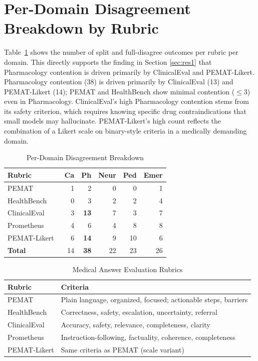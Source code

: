 \documentclass[11pt]{article}
\begin{document}
\section{Per-Domain Disagreement Breakdown by Rubric}
\label{app:domain}

Table~\ref{tab:rubric_domain} shows the number of split and full-disagree
outcomes per rubric per domain. This directly supports the finding in
Section \ref{sec:res1} that Pharmacology contention is driven primarily by ClinicalEval
and PEMAT-Likert.  Pharmacology
contention (38) is driven primarily by ClinicalEval (13) and
PEMAT-Likert (14); PEMAT and HealthBench show minimal
contention ($\leq$3) even in Pharmacology. ClinicalEval's high Pharmacology
contention stems from its safety criterion, which requires
knowing specific drug contraindications that small models may
hallucinate. PEMAT-Likert's high count reflects the combination of a Likert scale
on binary-style criteria in a medically demanding domain.

\begin{table}[h]
\centering
\small
\setlength{\tabcolsep}{6pt}
\begin{tabular}{@{}lrrrrr@{}}
\toprule
\textbf{Rubric} & \textbf{Ca} & \textbf{Ph}
  & \textbf{Neur} & \textbf{Ped} & \textbf{Emer} \\
\midrule
PEMAT        &  1 &  2 &  0 &  0 &  1 \\
HealthBench  &  0 &  3 &  2 &  2 &  4 \\
ClinicalEval &  3 & \textbf{13} &  7 &  3 &  7 \\
Prometheus   &  4 &  6 &  4 &  8 &  8 \\
PEMAT-Likert\  &  6 & \textbf{14} &  9 & 10 &  6 \\
\midrule
\textbf{Total}  & 14 & \textbf{38} & 22 & 23 & 26 \\
\bottomrule
\end{tabular}
\caption{Per-Domain Disagreement Breakdown}
\label{tab:rubric_domain}
\end{table}

\begin{table}[h!]
\centering
\small
\begin{tabular}{@{}lp{5cm}@{}}
\toprule
\textbf{Rubric} & \textbf{Criteria} \\
\midrule
 PEMAT        & Plain language, organized, focused; actionable steps, barriers \\
 HealthBench  & Correctness, safety, escalation, uncertainty, referral \\
 ClinicalEval & Accuracy, safety, relevance, completeness, clarity \\
Prometheus   & Instruction-following, factuality, coherence, completeness \\
PEMAT-Likert & Same criteria as PEMAT (scale variant) \\
\bottomrule
\end{tabular}
\caption{Medical Answer Evaluation Rubrics}
\label{tab:rubrics}
\end{table}
\end{document}
